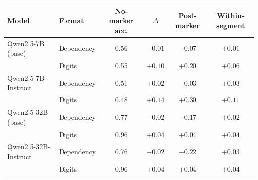 \begin{tabular}{ll cccc}
\toprule
Model & Format & No-marker acc. & $\Delta$ & Post-marker & Within-segment \\
\midrule
Qwen2.5-7B (base) & Dependency & 0.56 & $-0.01$ & $-0.07$ & $+0.01$ \\
 & Digits & 0.55 & $+0.10$ & $+0.20$ & $+0.06$ \\
Qwen2.5-7B-Instruct & Dependency & 0.51 & $+0.02$ & $-0.03$ & $+0.03$ \\
 & Digits & 0.48 & $+0.14$ & $+0.30$ & $+0.11$ \\
Qwen2.5-32B (base) & Dependency & 0.77 & $-0.02$ & $-0.17$ & $+0.02$ \\
 & Digits & 0.96 & $+0.04$ & $+0.04$ & $+0.04$ \\
Qwen2.5-32B-Instruct & Dependency & 0.76 & $-0.02$ & $-0.22$ & $+0.03$ \\
 & Digits & 0.96 & $+0.04$ & $+0.04$ & $+0.04$ \\
\bottomrule
\end{tabular}
